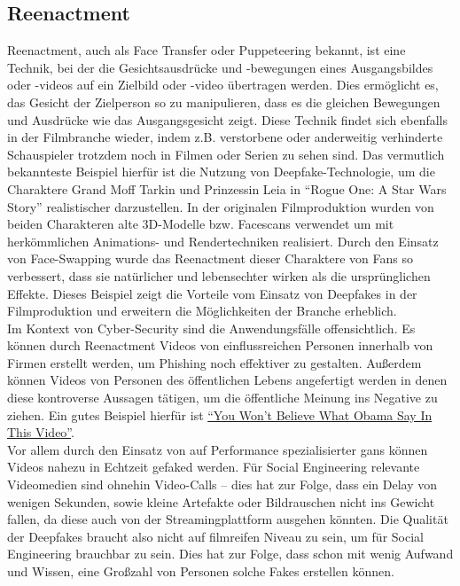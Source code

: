 \subsection*{Reenactment}\label{subsec:reenactment}
Reenactment, auch als Face Transfer oder Puppeteering bekannt, ist eine Technik, bei der die Gesichtsausdrücke und -bewegungen eines Ausgangsbildes oder -videos auf ein Zielbild oder -video übertragen werden.
Dies ermöglicht es, das Gesicht der Zielperson so zu manipulieren, dass es die gleichen Bewegungen und Ausdrücke wie das Ausgangsgesicht zeigt.
Diese Technik findet sich ebenfalls in der Filmbranche wieder, indem z.B. verstorbene oder anderweitig verhinderte Schauspieler trotzdem noch in Filmen oder Serien zu sehen sind.
Das vermutlich bekannteste Beispiel hierfür ist die Nutzung von Deepfake-Technologie, um die Charaktere Grand Moff Tarkin und Prinzessin Leia in ``Rogue One: A Star Wars Story'' realistischer darzustellen.
In der originalen Filmproduktion wurden von beiden Charakteren alte 3D-Modelle bzw. Facescans verwendet um mit herkömmlichen Animations- und Rendertechniken realisiert.
Durch den Einsatz von Face-Swapping wurde das Reenactment dieser Charaktere von Fans so verbessert, dass sie natürlicher und lebensechter wirken als die ursprünglichen Effekte.
Dieses Beispiel zeigt die Vorteile vom Einsatz von Deepfakes in der Filmproduktion und erweitern die Möglichkeiten der Branche erheblich\cite{rouge-one-deepfake}.\\
Im Kontext von Cyber-Security sind die Anwendungsfälle offensichtlich.
Es können durch Reenactment Videos von einflussreichen Personen innerhalb von Firmen erstellt werden, um Phishing noch effektiver zu gestalten.
Außerdem können Videos von Personen des öffentlichen Lebens angefertigt werden in denen diese kontroverse Aussagen tätigen, um die öffentliche Meinung ins Negative zu ziehen.
Ein gutes Beispiel hierfür ist \href{https://www.youtube.com/watch?v=cQ54GDm1eL0}{``You Won’t Believe What Obama Say In This Video''}.\\
Vor allem durch den Einsatz von auf Performance spezialisierter \glspl{gan} können Videos nahezu in Echtzeit gefaked werden.
Für Social Engineering relevante Videomedien sind ohnehin Video-Calls -- dies hat zur Folge, dass ein Delay von wenigen Sekunden, sowie kleine Artefakte oder Bildrauschen nicht ins Gewicht fallen, da diese auch von der Streamingplattform ausgehen könnten.
Die Qualität der Deepfakes braucht also nicht auf filmreifen Niveau zu sein, um für Social Engineering brauchbar zu sein.
Dies hat zur Folge, dass schon mit wenig Aufwand und Wissen, eine Großzahl von Personen solche Fakes erstellen können.